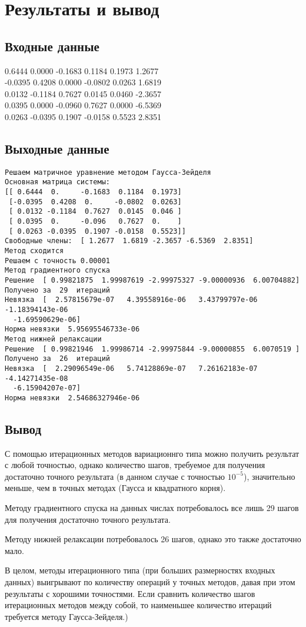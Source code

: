 \documentclass[11.4pt]{article}
\begin{document}
\section{Результаты и вывод}
	\subsection{Входные данные}
		0.6444 0.0000 -0.1683 0.1184 0.1973 1.2677\\
		-0.0395 0.4208 0.0000 -0.0802 0.0263 1.6819\\
		0.0132 -0.1184 0.7627 0.0145 0.0460 -2.3657\\
		0.0395 0.0000 -0.0960 0.7627 0.0000 -6.5369\\
		0.0263 -0.0395 0.1907 -0.0158 0.5523 2.8351\\
	\subsection{Выходные данные}
\begin{verbatim}
Решаем матричное уравнение методом Гаусса-Зейделя
Основная матрица системы:
[[ 0.6444  0.     -0.1683  0.1184  0.1973]
 [-0.0395  0.4208  0.     -0.0802  0.0263]
 [ 0.0132 -0.1184  0.7627  0.0145  0.046 ]
 [ 0.0395  0.     -0.096   0.7627  0.    ]
 [ 0.0263 -0.0395  0.1907 -0.0158  0.5523]]
Свободные члены:  [ 1.2677  1.6819 -2.3657 -6.5369  2.8351]
Метод сходится
Решаем с точность 0.00001
Метод градиентного спуска
Решение  [ 0.99821875  1.99987619 -2.99975327 -9.00000936  6.00704882] 
Получено за  29  итераций
Невязка  [  2.57815679e-07   4.39558916e-06   3.43799797e-06  -1.18394143e-06
  -1.69590629e-06]
Норма невязки  5.95695546733e-06
Метод нижней релаксации
Решение  [ 0.99821946  1.99986714 -2.99975844 -9.00000855  6.0070519 ] 
Получено за  26  итераций
Невязка  [  2.29096549e-06   5.74128869e-07   7.26162183e-07  -4.14271435e-08
  -6.15904207e-07]
Норма невязки  2.54686327946e-06
 \end{verbatim}
	\subsection{Вывод}
 С помощью итерационных методов вариационнго типа можно получить результат с любой точностью, однако количество шагов, требуемое для получения достаточно точного результата (в данном случае с точностью $10^{-5}$), значительно меньше, чем в точных методах (Гаусса и квадратного корня).\par Методу градиентного спуска на данных числах потребовалось все лишь 29 шагов для получения достаточно точного результата.\par Методу нижней релаксации потребовалось 26 шагов, однако это также достаточно мало.\par В целом, методы итерационного типа (при больших размерностях входных данных) выигрывают по количеству операций у точных методов, давая при этом результаты с хорошими точностями. Если сравнить количество шагов итерационных методов между собой, то наименьшее количество итераций требуется методу Гаусса-Зейделя.)\par
\newpage
\end{document}
